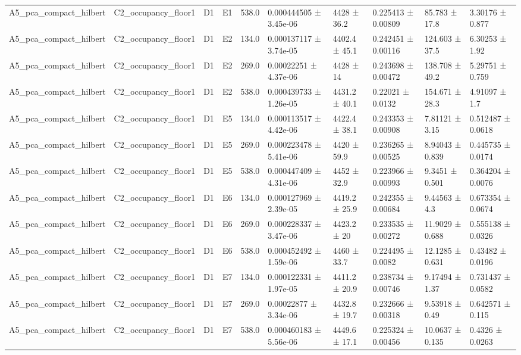 \begin{table}
\begin{tabular}{llllllllll}
A5\_pca\_compact\_hilbert & C2\_occupancy\_floor1 & D1 & E1 & 538.0 & 0.000444505 ± 3.45e-06 & 4428 ± 36.2 & 0.225413 ± 0.00809 & 85.783 ± 17.8 & 3.30176 ± 0.877 \\
A5\_pca\_compact\_hilbert & C2\_occupancy\_floor1 & D1 & E2 & 134.0 & 0.000137117 ± 3.74e-05 & 4402.4 ± 45.1 & 0.242451 ± 0.00116 & 124.603 ± 37.5 & 6.30253 ± 1.92 \\
A5\_pca\_compact\_hilbert & C2\_occupancy\_floor1 & D1 & E2 & 269.0 & 0.00022251 ± 4.37e-06 & 4428 ± 14 & 0.243698 ± 0.00472 & 138.708 ± 49.2 & 5.29751 ± 0.759 \\
A5\_pca\_compact\_hilbert & C2\_occupancy\_floor1 & D1 & E2 & 538.0 & 0.000439733 ± 1.26e-05 & 4431.2 ± 40.1 & 0.22021 ± 0.0132 & 154.671 ± 28.3 & 4.91097 ± 1.7 \\
A5\_pca\_compact\_hilbert & C2\_occupancy\_floor1 & D1 & E5 & 134.0 & 0.000113517 ± 4.42e-06 & 4422.4 ± 38.1 & 0.243353 ± 0.00908 & 7.81121 ± 3.15 & 0.512487 ± 0.0618 \\
A5\_pca\_compact\_hilbert & C2\_occupancy\_floor1 & D1 & E5 & 269.0 & 0.000223478 ± 5.41e-06 & 4420 ± 59.9 & 0.236265 ± 0.00525 & 8.94043 ± 0.839 & 0.445735 ± 0.0174 \\
A5\_pca\_compact\_hilbert & C2\_occupancy\_floor1 & D1 & E5 & 538.0 & 0.000447409 ± 4.31e-06 & 4452 ± 32.9 & 0.223966 ± 0.00993 & 9.3451 ± 0.501 & 0.364204 ± 0.0076 \\
A5\_pca\_compact\_hilbert & C2\_occupancy\_floor1 & D1 & E6 & 134.0 & 0.000127969 ± 2.39e-05 & 4419.2 ± 25.9 & 0.242355 ± 0.00684 & 9.44563 ± 4.3 & 0.673354 ± 0.0674 \\
A5\_pca\_compact\_hilbert & C2\_occupancy\_floor1 & D1 & E6 & 269.0 & 0.000228337 ± 3.47e-06 & 4423.2 ± 20 & 0.233535 ± 0.00272 & 11.9029 ± 0.688 & 0.555138 ± 0.0326 \\
A5\_pca\_compact\_hilbert & C2\_occupancy\_floor1 & D1 & E6 & 538.0 & 0.000452492 ± 1.59e-06 & 4460 ± 33.7 & 0.224495 ± 0.0082 & 12.1285 ± 0.631 & 0.43482 ± 0.0196 \\
A5\_pca\_compact\_hilbert & C2\_occupancy\_floor1 & D1 & E7 & 134.0 & 0.000122331 ± 1.97e-05 & 4411.2 ± 20.9 & 0.238734 ± 0.00746 & 9.17494 ± 1.37 & 0.731437 ± 0.0582 \\
A5\_pca\_compact\_hilbert & C2\_occupancy\_floor1 & D1 & E7 & 269.0 & 0.00022877 ± 3.34e-06 & 4432.8 ± 19.7 & 0.232666 ± 0.00318 & 9.53918 ± 0.49 & 0.642571 ± 0.115 \\
A5\_pca\_compact\_hilbert & C2\_occupancy\_floor1 & D1 & E7 & 538.0 & 0.000460183 ± 5.56e-06 & 4449.6 ± 17.1 & 0.225324 ± 0.00456 & 10.0637 ± 0.135 & 0.4326 ± 0.0263 \\

\end{tabular}
\end{table}
